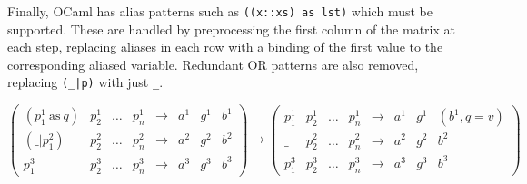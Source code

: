 
Finally, OCaml has alias patterns such as \verb|((x::xs) as lst)| which must be supported. These are handled by preprocessing the first column of the matrix at each step, replacing aliases in each row with a binding of the first value to the corresponding aliased variable. Redundant OR patterns are also removed, replacing \verb"(_|p)" with just \verb|_|.


$
\begin{pmatrix}
(p^1_1\ \mathrm{as}\ q) & p^1_2 & \dots & p^1_n & \to & a^1 & g^1 & b^1 \\
(\_ | p^2_1) & p^2_2 & \dots & p^2_n & \to & a^2 & g^2 & b^2 \\
p^3_1 & p^3_2 & \dots & p^3_n & \to & a^3 & g^3 & b^3
\end{pmatrix}
\to
\begin{pmatrix}
 p^1_1 & p^1_2 & \dots & p^1_n  & \to & a^1 & g^1 & (b^1, q=v) \\
\_ & p^2_2 & \dots & p^2_n  & \to & a^2 & g^2 & b^2 \\
p^3_1 & p^3_2 & \dots & p^3_n  & \to & a^3 & g^3 & b^3
\end{pmatrix}
$

